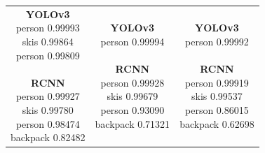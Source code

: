 \documentclass{article}
\begin{document}
\begin{center}
\begin{tabular}{c c c}
        \makecell[t]{\textbf{YOLOv3} \\ person 0.99993 \\ skis 0.99864 \\ person 0.99809 \\ \\ \textbf{RCNN} \\ person 0.99927 \\ skis 0.99780 \\ person 0.98474 \\ backpack 0.82482} & \makecell[t]{\textbf{YOLOv3} \\ person 0.99994 \\ \\ \textbf{RCNN} \\ person 0.99928 \\ skis 0.99679 \\ person 0.93090 \\ backpack 0.71321 } & \makecell[t]{\textbf{YOLOv3} \\ person 0.99992 \\ \\ \textbf{RCNN} \\ person 0.99919 \\ skis 0.99537 \\ person 0.86015 \\ backpack 0.62698} \\[4.5cm]
    \end{tabular}
\end{center}
\end{document}
